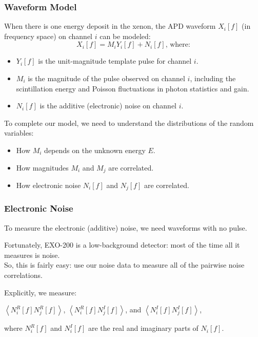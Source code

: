 \documentclass{beamer}
\begin{document}
\begin{frame}
\begin{center}
\frametitle{Waveform Model}
\end{center}
\vspace{0.5cm}
When there is one energy deposit in the xenon, the APD waveform $X_i[f]$ (in frequency space) on channel $i$ can be modeled:
\[X_i[f] = M_i Y_i[f] + N_i[f]\text{, where:}\]
\begin{itemize}
\item $Y_i[f]$ is the unit-magnitude template pulse for channel $i$.
\item $M_i$ is the magnitude of the pulse observed on channel $i$, including the scintillation energy and Poisson fluctuations in photon statistics and gain.
\item $N_i[f]$ is the additive (electronic) noise on channel $i$.\\[\baselineskip]
\end{itemize}

To complete our model, we need to understand the distributions of the random variables:
\begin{itemize}
\item How $M_i$ depends on the unknown energy $E$.
\item How magnitudes $M_i$ and $M_j$ are correlated.
\item How electronic noise $N_i[f]$ and $N_j[f]$ are correlated.
\end{itemize}
\end{frame}

\begin{frame}
\begin{center}
\frametitle{Electronic Noise}
\end{center}
To measure the electronic (additive) noise, we need waveforms with no pulse.

Fortunately, EXO-200 is a low-background detector: most of the time all it measures is noise.\\[\baselineskip]

So, this is fairly easy: use our noise data to measure all of the pairwise noise correlations.

Explicitly, we measure:\\
\begin{center}
$\left<N_i^R[f]N_j^R[f]\right>$, $\left<N_i^R[f]N_j^I[f]\right>$, and $\left<N_i^I[f]N_j^I[f]\right>$,\\
\end{center}
where $N_i^R[f]$ and $N_i^I[f]$ are the real and imaginary parts of $N_i[f]$.
\end{frame}
\end{document}
